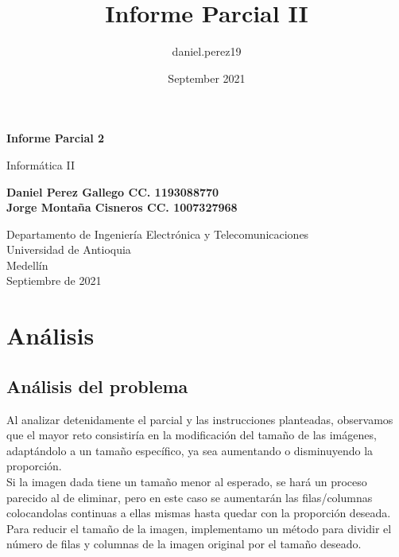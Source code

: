 \documentclass{article}
\title{Informe Parcial II}
\author{daniel.perez19 }
\date{September 2021}
\begin{document}
\begin{titlepage}
    \begin{center}
        \vspace*{1cm}
            
        \Huge
        \textbf{Informe Parcial 2}
            
        \vspace{0.5cm}
        \LARGE
        Informática II
            
        \vspace{1.5cm}
            
        \textbf{Daniel Perez Gallego CC. 1193088770\\Jorge Montaña Cisneros CC.  1007327968}
            
        \vfill
            
        \vspace{0.8cm}
            
        \Large
        Departamento de Ingeniería Electrónica y Telecomunicaciones\\
        Universidad de Antioquia\\
        Medellín\\
        Septiembre de 2021
            
    \end{center}
\end{titlepage}

\tableofcontents

\section{Análisis}
\subsection{Análisis del problema}
Al analizar detenidamente el parcial y las instrucciones planteadas, observamos que el mayor reto consistiría en la modificación del tamaño de las imágenes, adaptándolo a un tamaño específico, ya sea aumentando o disminuyendo la proporción.\\ 

Si la imagen dada tiene un tamaño menor al esperado, se hará un proceso parecido al de eliminar, pero en este caso se aumentarán las filas/columnas colocandolas continuas a ellas mismas  hasta quedar con la proporción deseada.\\

Para reducir el tamaño de la imagen, implementamo un método para dividir el número de filas y columnas de la imagen original por el tamaño deseado.\\
\end{document}
